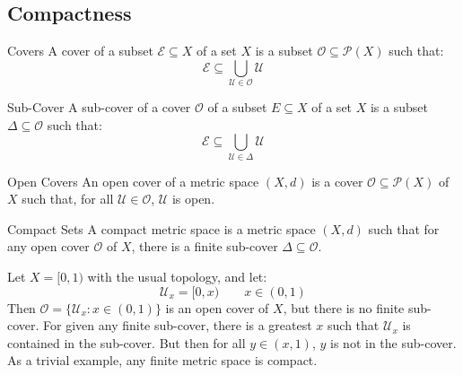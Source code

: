 \documentclass[crop=false,class=article,oneside]{standalone}
\begin{document}
        \subsection{Compactness}
            \begin{ldefinition}{Covers}
                A cover of a subset $\mathcal{E}\subseteq{X}$ of
                a set $X$ is a subset
                $\mathcal{O}\subseteq\mathcal{P}(X)$ such that:
                \begin{equation}
                    \mathcal{E}\subseteq
                    \bigcup_{\mathcal{U}\in\mathcal{O}}
                        \mathcal{U}
                \end{equation}
            \end{ldefinition}
            \begin{ldefinition}{Sub-Cover}
                A sub-cover of a cover $\mathcal{O}$ of a subset
                $E\subseteq{X}$ of a set $X$ is a subset
                $\Delta\subseteq\mathcal{O}$ such that:
              \begin{equation}
                    \mathcal{E}\subseteq
                    \bigcup_{\mathcal{U}\in\Delta}
                        \mathcal{U}
                \end{equation}
            \end{ldefinition}
            \begin{ldefinition}{Open Covers}
                An open cover of a metric space $(X,d)$ is a cover
                $\mathcal{O}\subseteq\mathcal{P}(X)$ of $X$ such
                that, for all $\mathcal{U}\in\mathcal{O}$,
                $\mathcal{U}$ is open.
            \end{ldefinition}
            \begin{ldefinition}{Compact Sets}
                A compact metric space is a metric space $(X,d)$
                such that for any open cover $\mathcal{O}$ of
                $X$, there is a finite
                sub-cover $\Delta\subseteq\mathcal{O}$.
            \end{ldefinition}
            \begin{lexample}
                Let $X=[0,1)$ with the usual topology, and let:
                \begin{equation}
                    \mathcal{U}_{x}=[0,x)
                    \quad\quad
                    x\in(0,1)
                \end{equation}
                Then $\mathcal{O}=\{\mathcal{U}_{x}:x\in(0,1)\}$
                is an open cover of $X$, but there is no finite
                sub-cover. For given any finite sub-cover,
                there is a greatest $x$ such that
                $\mathcal{U}_{x}$ is contained in the sub-cover.
                But then for all $y\in(x,1)$, $y$ is not in
                the sub-cover. As a trivial example, any
                finite metric space is compact.
            \end{lexample}
\end{document}
